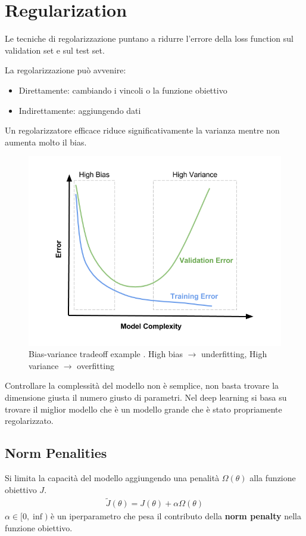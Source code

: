 \chapter{Regularization}
Le tecniche di regolarizzazione puntano a ridurre l'errore della loss function sul validation set e sul test set.

La regolarizzazione può avvenire:
\begin{itemize}
  \item Direttamente: cambiando i vincoli o la funzione obiettivo
  \item Indirettamente: aggiungendo dati
\end{itemize}

Un regolarizzatore efficace riduce significativamente la varianza mentre non aumenta molto il bias. 

\begin{figure}[ht]
  \centering
  \includegraphics[width=0.8\linewidth]{images/Bias-Variance-Tradeoff-In-Machine-Learning-1.png}
  \caption{Bias-variance tradeoff example \cite{img:model-complexity}. High bias $\rightarrow$ underfitting,  High variance $\rightarrow$ overfitting}
\end{figure}

Controllare la complessità del modello non è semplice, non basta trovare la dimensione giusta il numero giusto di parametri.
Nel deep learning si basa su trovare il miglior modello che è un modello grande che è stato propriamente regolarizzato.

\section{Norm Penalities}
Si limita la capacità del modello aggiungendo una penalità $\Omega(\theta)$ alla funzione obiettivo $J$. 
%
\begin{align*}
  \tilde{J}(\theta) = J(\theta) + \alpha \Omega(\theta)
\end{align*}
%
$\alpha \in [0, \inf)$ è un iperparametro che pesa il contributo della \textbf{norm penalty} nella funzione obiettivo.

